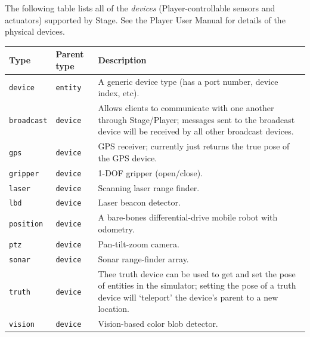 \documentclass[11pt]{report}
\begin{document}
The following table lists all of the {\em devices}
(Player-controllable sensors and actuators) supported by Stage.  See
the Player User Manual for details of the physical devices.
\vspace{1em}\\\noindent
\begin{tabularx}{\columnwidth}{llX}
\hline 
Type & Parent type & Description \\
\hline

\verb'device' & \verb'entity' & A generic device type (has a port
number, device index, etc). \\

\hline

\verb'broadcast' & \verb'device' & Allows clients to communicate with
one another through Stage/Player; messages sent to the broadcast
device will be received by all other broadcast devices.\\

\verb'gps' & \verb'device' & GPS receiver; currently just returns the
true pose of the GPS device.\\

\verb'gripper' & \verb'device' & 1-DOF gripper (open/close).\\

\verb'laser' & \verb'device' & Scanning laser range finder.\\

\verb'lbd' & \verb'device' & Laser beacon detector.\\

\verb'position' & \verb'device' & A bare-bones differential-drive
mobile robot with odometry.\\

\verb'ptz' & \verb'device' & Pan-tilt-zoom camera. \\

\verb'sonar' & \verb'device' & Sonar range-finder array.\\

\verb'truth' & \verb'device' & Thee truth device can be used to get
and set the pose of entities in the simulator; setting the pose of a
truth device will `teleport' the device's parent to a new location.\\

\verb'vision' & \verb'device' & Vision-based color blob detector.\\

\hline
\end{tabularx}
\vspace{1em}\\
\end{document}
